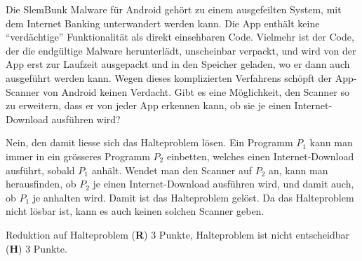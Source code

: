 Die SlemBunk Malware für Android gehört zu einem ausgefeilten
System, mit dem Internet Banking unterwandert werden kann.
Die App enthält keine ``verdächtige'' Funktionalität als direkt
einsehbaren Code. 
Vielmehr ist der Code, der die endgültige Malware herunterlädt,
unscheinbar verpackt, und wird von der App erst zur Laufzeit
ausgepackt und in den Speicher geladen, wo er dann auch ausgeführt
werden kann.
Wegen dieses komplizierten Verfahrens schöpft der App-Scanner von
Android keinen Verdacht.
Gibt es eine Möglichkeit, den Scanner so zu erweitern, dass er 
von jeder App erkennen kann, ob sie je einen Internet-Download
ausführen wird?

\begin{loesung}
Nein, den damit liesse sich das Halteproblem lösen.
Ein Programm $P_1$ kann man immer in ein grösseres Programm $P_2$
einbetten, welches einen Internet-Download ausführt, sobald $P_1$
anhält.
Wendet man den Scanner auf $P_2$ an,
kann man herausfinden, ob $P_2$
je einen Internet-Download ausführen wird, und damit auch, ob
$P_1$ je anhalten wird.
Damit ist das Halteproblem gelöst.
Da das Halteproblem nicht lösbar ist, kann es auch keinen solchen
Scanner geben.
\end{loesung}

\begin{bewertung}
Reduktion auf Halteproblem ({\bf R}) 3 Punkte,
Halteproblem ist nicht entscheidbar ({\bf H}) 3 Punkte.
\end{bewertung}




